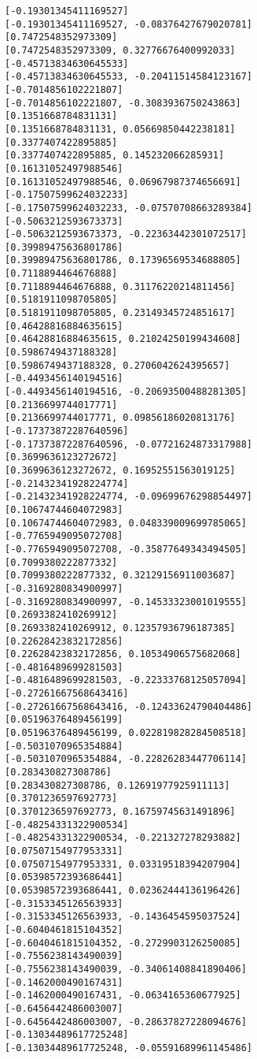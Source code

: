 \documentclass[11pt]{article}
\begin{document}
\begin{Verbatim}[commandchars=\\\{\}]
[-0.19301345411169527]
[-0.19301345411169527, -0.08376427679020781]
[0.7472548352973309]
[0.7472548352973309, 0.32776676400992033]
[-0.45713834630645533]
[-0.45713834630645533, -0.20411514584123167]
[-0.7014856102221807]
[-0.7014856102221807, -0.3083936750243863]
[0.1351668784831131]
[0.1351668784831131, 0.05669850442238181]
[0.3377407422895885]
[0.3377407422895885, 0.145232066285931]
[0.16131052497988546]
[0.16131052497988546, 0.06967987374656691]
[-0.17507599624032233]
[-0.17507599624032233, -0.07570708663289384]
[-0.5063212593673373]
[-0.5063212593673373, -0.22363442301072517]
[0.39989475636801786]
[0.39989475636801786, 0.17396569534688805]
[0.7118894464676888]
[0.7118894464676888, 0.31176220214811456]
[0.5181911098705805]
[0.5181911098705805, 0.23149345724851617]
[0.46428816884635615]
[0.46428816884635615, 0.21024250199434608]
[0.5986749437188328]
[0.5986749437188328, 0.2706042624395657]
[-0.4493456140194516]
[-0.4493456140194516, -0.20693500488281305]
[0.2136699744017771]
[0.2136699744017771, 0.09856186020813176]
[-0.17373872287640596]
[-0.17373872287640596, -0.07721624873317988]
[0.3699636123272672]
[0.3699636123272672, 0.16952551563019125]
[-0.21432341928224774]
[-0.21432341928224774, -0.09699676298854497]
[0.10674744604072983]
[0.10674744604072983, 0.048339009699785065]
[-0.7765949095072708]
[-0.7765949095072708, -0.35877649343494505]
[0.7099380222877332]
[0.7099380222877332, 0.32129156911003687]
[-0.3169280834900997]
[-0.3169280834900997, -0.14533323001019555]
[0.2693382410269912]
[0.2693382410269912, 0.12357936796187385]
[0.22628423832172856]
[0.22628423832172856, 0.10534906575682068]
[-0.4816489699281503]
[-0.4816489699281503, -0.22333768125057094]
[-0.27261667568643416]
[-0.27261667568643416, -0.12433624790404486]
[0.05196376489456199]
[0.05196376489456199, 0.022819828284508518]
[-0.5031070965354884]
[-0.5031070965354884, -0.22826283447706114]
[0.283430827308786]
[0.283430827308786, 0.12691977925911113]
[0.3701236597692773]
[0.3701236597692773, 0.16759745631491896]
[-0.48254331322900534]
[-0.48254331322900534, -0.221327278293882]
[0.07507154977953331]
[0.07507154977953331, 0.03319518394207904]
[0.05398572393686441]
[0.05398572393686441, 0.02362444136196426]
[-0.3153345126563933]
[-0.3153345126563933, -0.1436454595037524]
[-0.6040461815104352]
[-0.6040461815104352, -0.2729903126250085]
[-0.7556238143490039]
[-0.7556238143490039, -0.34061408841890406]
[-0.1462000490167431]
[-0.1462000490167431, -0.0634165360677925]
[-0.6456442486003007]
[-0.6456442486003007, -0.28637827228094676]
[-0.13034489617725248]
[-0.13034489617725248, -0.05591689961145486]

\end{Verbatim}
\end{document}
